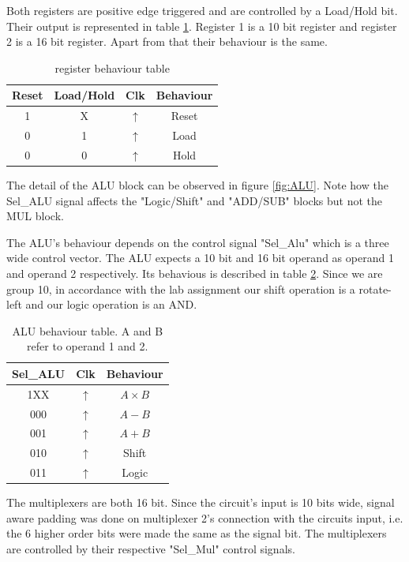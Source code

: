 \documentclass[12pt]{article}
\begin{document}
Both registers are positive edge triggered and are controlled by a Load/Hold bit. Their output is represented in table \ref{tab:Reg}. Register 1 is a 10 bit register and register 2 is a 16 bit register. Apart from that their behaviour is the same.

\begin{table}[H]
	\center
	\begin{tabular}{|c|c|c|c|}
		\hline
		Reset & Load/Hold & Clk        & Behaviour \\
		\hline
		1     & X         & $\uparrow$ & Reset     \\
		0     & 1         & $\uparrow$ & Load      \\
		0     & 0         & $\uparrow$ & Hold      \\
		\hline
	\end{tabular}
	\caption{register behaviour table}
	\label{tab:Reg}
\end{table}

The detail of the ALU block can be observed in figure \ref{fig:ALU}. Note how the Sel\_ALU signal affects the "Logic/Shift" and "ADD/SUB" blocks but not the MUL block. 

The ALU's behaviour depends on the control signal "Sel\_Alu" which is a three wide control vector. The ALU expects a 10 bit and 16 bit operand as operand 1 and operand 2 respectively. Its behavious is described in table \ref{tab:ALU}. Since we are group 10, in accordance with the lab assignment our shift operation is a rotate-left and our logic operation is an AND.

\begin{table}[H]
	\center
	\begin{tabular}{|c|c|c|}
		\hline
		Sel\_ALU & Clk        & Behaviour       \\
		\hline
		1XX     & $\uparrow$ & $A \times B$ \\
		000     & $\uparrow$ & $A-B$        \\
		001     & $\uparrow$ & $A+B$        \\
		010     & $\uparrow$ & Shift        \\
		011     & $\uparrow$ & Logic        \\
		\hline
	\end{tabular}
	\caption{ALU behaviour table. A and B refer to operand 1 and 2.}
	\label{tab:ALU}
\end{table}

The multiplexers are both 16 bit. Since the circuit's input is 10 bits wide, signal aware padding was done on multiplexer 2's connection with the circuits input, i.e. the 6 higher order bits were made the same as the signal bit.
The multiplexers are controlled by their respective "Sel\_Mul" control signals.
\end{document}
